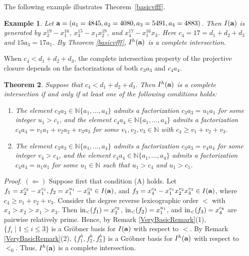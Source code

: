 \documentclass[10pt]{amsart}
\newtheorem{thm1}{Theorem}[section]
\newtheorem{ex1}[thm1]{Example}
\begin{document}
The following example illustrates Theorem~\ref{basicvfff}.

\begin{ex1} {\rm Let ${\bf a}=(a_{1}=4845,a_2=4080,a_3=5491,a_{4}=4883)$. Then $I({\bf a})$ is generated by $x_{2}^{19}-x_{1}^{16}$, $x_{3}^{15}-x_{1}x_{2}^{19}$, and $x_{4}^{17}-x_{1}^{16}x_{3}$. Here $c_4=17=d_1+d_2+d_3$ and $15a_3=17a_1 $. By Theorem \ref{basicvfff}, $I^{h}({\bf a})$ is a complete intersection.}
\end{ex1}

When $c_4<d_1+d_2+d_3$, the complete intersection property of the projective closure depends on the factorizations of both $c_3a_3$ and $c_4a_4$.

\begin{thm1} \label{Basic24} Suppose that $c_4<d_1+d_2+d_3$. Then $I^{h}({\bf a})$ is a complete intersection if and only if at least one of the following conditions holds: \begin{enumerate} \item[(A)] The element $c_{3}a_3 \in \mathbb{N}\{a_1,\ldots,a_4\}$ admits a factorization $c_{3}a_3=u_1a_{1}$ for some integer $u_{1}>c_1$, and the element $c_{4}a_4 \in \mathbb{N}\{a_1,\ldots,a_4\}$ admits a factorization $c_{4}a_4=v_1a_{1}+v_2a_{2}+v_3a_3$ for some $v_1, v_2, v_3 \in \mathbb{N}$ with $c_4 \geq v_1+v_2+v_3$.
\item[(B)] The element $c_{3}a_3 \in \mathbb{N}\{a_1,\ldots,a_4\}$ admits a factorization $c_{3}a_3=v_4a_{4}$ for some integer $v_{4}>c_4$, and the element $c_{4}a_4 \in \mathbb{N}\{a_1,\ldots,a_4\}$ admits a factorization $c_{4}a_4=u_1a_{1}$ for some $u_1 \in \mathbb{N}$ such that $u_1>c_4$ and $u_1>c_1$.
\end{enumerate}
\end{thm1}
{\em \noindent Proof.} $(\Leftarrow)$ Suppose first that condition (A) holds. Let $f_{1}=x_{2}^{c_2}-x_{1}^{c_1}, f_{2}=x_{1}^{u_1}-x_{3}^{c_3} \in I({\bf a})$, and $f_{3}=x_{4}^{c_4}-x_{1}^{v_1}x_{2}^{v_2}x_{3}^{v_3} \in I({\bf a})$, where $c_{4} \geq v_1+v_{2}+v_{3}$. Consider the degree reverse lexicographic order $<$ with $x_4>x_2>x_1>x_3$. Then ${\rm in}_{<}(f_{1})=x_{2}^{c_2}$, ${\rm in}_{<}(f_{2})=x_{1}^{u_1}$, and ${\rm in}_{<}(f_{3})=x_{4}^{c_4}$ are pairwise relatively prime. Hence, by Remark \ref{VeryBasicRemark}(1), $\{f_{i} \mid 1 \leq i \leq 3\}$ is a Gr\"obner basis for $I({\bf a})$ with respect to $<$. By Remark \ref{VeryBasicRemark}(2), $\{f_1^h,f_2^h,f_3^h\}$ is a Gr\"obner basis for $I^{h}({\bf a})$ with respect to $<_{0}$. Thus, $I^{h}({\bf a})$ is a complete intersection. 
\end{document}
